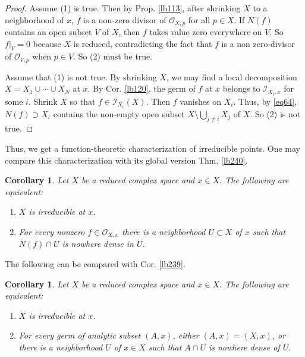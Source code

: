\documentclass[12pt,b5paper,notitlepage]{report}
\theoremstyle{definition}
\theoremstyle{plain}
\newtheorem{co}[df]{Corollary}
\newcommand{\scr}{\mathscr}
\numberwithin{equation}{section}
\begin{document}
\begin{proof}
Assume (1) is true. Then by Prop. \ref{lb113}, after shrinking $X$ to a neighborhood of $x$, $f$ is a non-zero divisor of $\scr O_{X,p}$ for all $p\in X$. If $N(f)$ contains an open subset $V$ of $X$, then $f$ takes value zero everywhere on $V$. So $f|_V=0$ because $X$ is reduced, contradicting the fact that $f$ is a non zero-divisor of $\scr O_{V,p}$ when $p\in V$.  So (2) must be true.

Assume that (1) is not true. By shrinking $X$, we may find a local decomposition $X=X_1\cup\cdots\cup X_N$ at $x$. By Cor. \ref{lb120}, the germ of $f$ at $x$ belongs to $\scr I_{X_i,x}$ for some $i$. Shrink $X$ so that $f\in\scr I_{X_i}(X)$. Then $f$ vanishes on $X_i$. Thus, by \eqref{eq64}, $N(f)\supset X_i$ contains the non-empty open subset $X\setminus \bigcup_{j\neq i}X_j$ of $X$. So (2) is not true.
\end{proof}

Thus, we get a function-theoretic characterization of irreducible points. One may compare this characterization with its global version Thm. \ref{lb240}.

\begin{co}\label{lb369}
Let $X$ be a reduced complex space and $x\in X$. The following are equivalent:
\begin{enumerate}[label=(\arabic*)]
\item $X$ is irreducible at $x$.
\item For every nonzero $f\in\scr O_{X,x}$ there is a neighborhood $U\subset X$ of $x$ such that $N(f)\cap U$ is nowhere dense in $U$.
\end{enumerate}
\end{co}





The following can be compared with Cor. \ref{lb239}.

\begin{co}\label{lb177}
Let $X$ be a reduced complex space and $x\in X$. The following are equivalent:
\begin{enumerate}[label=(\arabic*)]
\item $X$ is irreducible at $x$.
\item For every germ of analytic subset $(A,x)$, either $(A,x)=(X,x)$, or there is a neighborhood $U$ of $x\in X$ such that $A\cap U$ is nowhere dense  of $U$. 
\end{enumerate}
\end{co}
\end{document}
